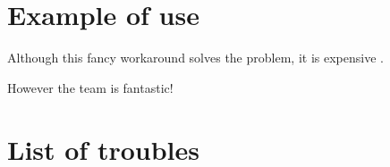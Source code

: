 \documentclass{article}
\begin{document}
\section{Example of use}

Although this fancy workaround solves the problem, it is expensive . %

However the team is fantastic!  %

\section{List of troubles}

\listoftroubles
\end{document}
